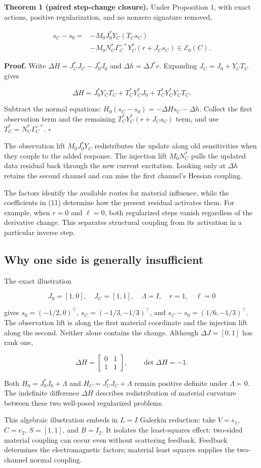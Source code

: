 \textbf{Theorem 1 (paired step-change closure).} Under Proposition 1, with exact actions, positive regularization, and no nonzero signature removed,

\[
\begin{aligned}
s_C-s_0={}&-M_0J_0^*Y_C(T_Cs_C)\\
&-M_0N_C^*\Gamma_C^{-*}Y_C^*(r+J_Cs_C)
\in\mathcal E_0(C).
\end{aligned} \tag{11}
\]

\textbf{Proof.} Write \(\Delta H=J_C^*J_C-J_0^*J_0\) and \(\Delta h=\Delta J^*r\). Expanding \(J_C=J_0+Y_CT_C\) gives

\[
\Delta H=J_0^*Y_CT_C+T_C^*Y_C^*J_0+T_C^*Y_C^*Y_CT_C.
\]

Subtract the normal equations: \(H_0(s_C-s_0)=-\Delta Hs_C-\Delta h\). Collect the first observation term and the remaining \(T_C^*Y_C^*(r+J_Cs_C)\) term, and use \(T_C^*=N_C^*\Gamma_C^{-*}\). \hfill\(\square\)

The observation lift \(M_0J_0^*Y_C\) redistributes the update along old sensitivities when they couple to the added response. The injection lift \(M_0N_C^*\) pulls the updated data residual back through the new current excitation. Looking only at \(\Delta h\) retains the second channel and can miss the first channel's Hessian coupling.

The factors identify the available routes for material influence, while the coefficients in (11) determine how the present residual activates them. For example, when $r=0$ and $\ell=0$, both regularized steps vanish regardless of the derivative change. This separates structural coupling from its activation in a particular inverse step.

\subsection{Why one side is generally insufficient}

The exact illustration

\[
J_0=[1,0],\quad J_C=[1,1],\quad \Lambda=I,\quad r=1,\quad\ell=0
\]

gives \(s_0=(-1/2,0)^\top\), \(s_C=(-1/3,-1/3)^\top\), and \(s_C-s_0=(1/6,-1/3)^\top\). The observation lift is along the first material coordinate and the injection lift along the second. Neither alone contains the change. Although \(\Delta J=[0,1]\) has rank one,

\[
\Delta H=\begin{bmatrix}0&1\\1&1\end{bmatrix},\qquad\det\Delta H=-1. \tag{12}
\]

Both \(H_0=J_0^*J_0+\Lambda\) and \(H_C=J_C^*J_C+\Lambda\) remain positive definite under \(\Lambda\succ0\). The indefinite difference \(\Delta H\) describes redistribution of material curvature between these two well-posed regularized problems.

This algebraic illustration embeds in \(L=I\) Galerkin reduction: take $V=e_1$, $C=e_2$, $S=[1,1]$, and $B=I_2$. It isolates the least-squares effect: two-sided material coupling can occur even without scattering feedback. Feedback determines the electromagnetic factors; material least squares supplies the two-channel normal coupling.
